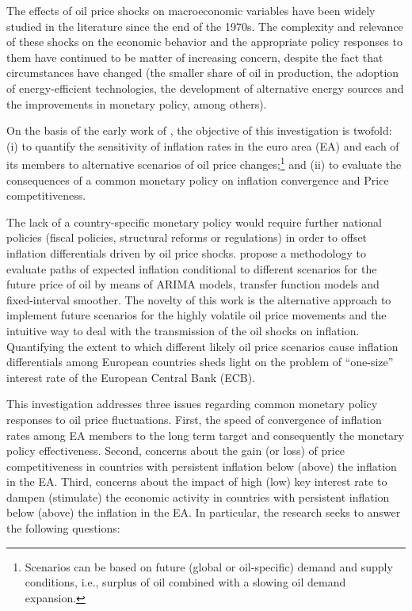 \documentclass{article}\usepackage[]{graphicx}\usepackage[]{color}
\begin{document}
\vspace{5pt}

The effects of oil price shocks on macroeconomic variables have been widely studied in the literature since the end of the 1970s. The complexity and relevance of these shocks on the economic behavior and the appropriate policy responses to them have continued to be matter of increasing concern, despite the fact that circumstances have changed (the smaller share of oil in production, the adoption of energy-efficient technologies, the development of alternative energy sources and the improvements in monetary policy, among others).

On the basis of the early work of \cite{Castro2016}, the objective of this investigation is twofold: (i) to quantify the sensitivity of inflation rates in the euro area (EA) and each of its members to alternative scenarios of oil price changes;\footnote{Scenarios can be based on future (global or oil-specific) demand and supply conditions, i.e., surplus of oil combined with a slowing oil demand expansion.} and (ii) to evaluate the consequences of a common monetary policy on inflation convergence and Price competitiveness.

The lack of a country-specific monetary policy would require further national policies (fiscal policies, structural reforms or regulations) in order to offset inflation differentials driven by oil price shocks. \cite{Castro2016} propose a methodology to evaluate paths of expected inflation conditional to different scenarios for the future price of oil by means of ARIMA models, transfer function models and fixed-interval smoother. The novelty of this work is the alternative approach to implement future scenarios for the highly volatile oil price movements and the intuitive way to deal with the transmission of the oil shocks on inflation. Quantifying the extent to which different likely oil price scenarios cause inflation differentials among European countries sheds light on the problem of ``one-size'' interest rate of the European Central Bank (ECB).

This investigation addresses three issues regarding common monetary policy responses to oil price fluctuations. First, the speed of convergence of inflation rates among EA members to the long term target and consequently the  monetary policy effectiveness. Second, concerns about the gain (or loss) of price competitiveness in countries with persistent inflation below (above) the inflation in the EA. Third, concerns about the impact of high (low) key interest rate to dampen (stimulate) the economic activity in countries with persistent inflation below (above) the inflation in the EA. In particular, the research seeks to answer the following questions:
\end{document}
